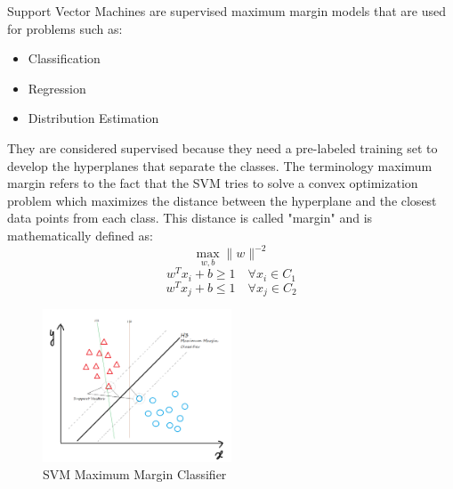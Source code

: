 Support Vector Machines are supervised maximum margin models that are used for problems such as:
\begin{itemize}
    \item Classification
    \item Regression
    \item Distribution Estimation
\end{itemize}
They are considered supervised because they need a pre-labeled training set to develop 
the hyperplanes that separate the classes. The terminology maximum margin refers to the
fact that the SVM tries to solve a convex optimization problem which maximizes the 
distance between the hyperplane and the closest data points from each class. This 
distance is called "margin" and is mathematically defined as:
\begin{equation}
    \max_{w, b}{\|w\|^{-2}}
\end{equation}
\begin{equation}
    w^Tx_i + b \geq 1 \quad \forall x_i \in C_1
\end{equation}
\begin{equation}
    w^Tx_j + b \leq 1 \quad \forall x_j \in C_2
\end{equation}
\begin{figure}[H]
    \centering
    \includegraphics[width=0.5\textwidth]{media/svm_example.png}
    \caption{SVM Maximum Margin Classifier}
\end{figure}
